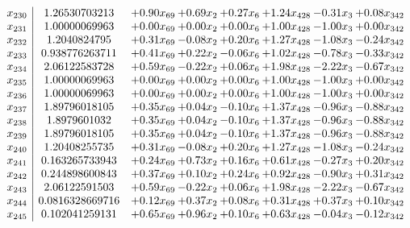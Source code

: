 \documentclass[8pt]{article}
\begin{document}
\[\begin{array}{c| c c@{\hskip 2pt} c@{\hskip 2pt} c@{\hskip 2pt} c@{\hskip 2pt} c@{\hskip 2pt} c@{\hskip 2pt} }
 x_{230}   &  1.26530703213 & +  0.90 x_{69} & +  0.69 x_{2} & +  0.27 x_{6} & +  1.24 x_{428} & -0.31 x_{3} & +  0.08 x_{342}\\
 x_{231}   &  1.00000069963 & +  0.00 x_{69} & +  0.00 x_{2} & +  0.00 x_{6} & +  1.00 x_{428} & -1.00 x_{3} & +  0.00 x_{342}\\
 x_{232}   &  1.2040824795 & +  0.31 x_{69} & -0.08 x_{2} & +  0.20 x_{6} & +  1.27 x_{428} & -1.08 x_{3} & -0.24 x_{342}\\
 x_{233}   &  0.938776263711 & +  0.41 x_{69} & +  0.22 x_{2} & -0.06 x_{6} & +  1.02 x_{428} & -0.78 x_{3} & -0.33 x_{342}\\
 x_{234}   &  2.06122583728 & +  0.59 x_{69} & -0.22 x_{2} & +  0.06 x_{6} & +  1.98 x_{428} & -2.22 x_{3} & -0.67 x_{342}\\
 x_{235}   &  1.00000069963 & +  0.00 x_{69} & +  0.00 x_{2} & +  0.00 x_{6} & +  1.00 x_{428} & -1.00 x_{3} & +  0.00 x_{342}\\
 x_{236}   &  1.00000069963 & +  0.00 x_{69} & +  0.00 x_{2} & +  0.00 x_{6} & +  1.00 x_{428} & -1.00 x_{3} & +  0.00 x_{342}\\
 x_{237}   &  1.89796018105 & +  0.35 x_{69} & +  0.04 x_{2} & -0.10 x_{6} & +  1.37 x_{428} & -0.96 x_{3} & -0.88 x_{342}\\
 x_{238}   &  1.8979601032 & +  0.35 x_{69} & +  0.04 x_{2} & -0.10 x_{6} & +  1.37 x_{428} & -0.96 x_{3} & -0.88 x_{342}\\
 x_{239}   &  1.89796018105 & +  0.35 x_{69} & +  0.04 x_{2} & -0.10 x_{6} & +  1.37 x_{428} & -0.96 x_{3} & -0.88 x_{342}\\
 x_{240}   &  1.20408255735 & +  0.31 x_{69} & -0.08 x_{2} & +  0.20 x_{6} & +  1.27 x_{428} & -1.08 x_{3} & -0.24 x_{342}\\
 x_{241}   &  0.163265733943 & +  0.24 x_{69} & +  0.73 x_{2} & +  0.16 x_{6} & +  0.61 x_{428} & -0.27 x_{3} & +  0.20 x_{342}\\
 x_{242}   &  0.244898600843 & +  0.37 x_{69} & +  0.10 x_{2} & +  0.24 x_{6} & +  0.92 x_{428} & -0.90 x_{3} & +  0.31 x_{342}\\
 x_{243}   &  2.06122591503 & +  0.59 x_{69} & -0.22 x_{2} & +  0.06 x_{6} & +  1.98 x_{428} & -2.22 x_{3} & -0.67 x_{342}\\
 x_{244}   &  0.0816328669716 & +  0.12 x_{69} & +  0.37 x_{2} & +  0.08 x_{6} & +  0.31 x_{428} & +  0.37 x_{3} & +  0.10 x_{342}\\
 x_{245}   &  0.102041259131 & +  0.65 x_{69} & +  0.96 x_{2} & +  0.10 x_{6} & +  0.63 x_{428} & -0.04 x_{3} & -0.12 x_{342}\\

\end{array}\]
\end{document}
